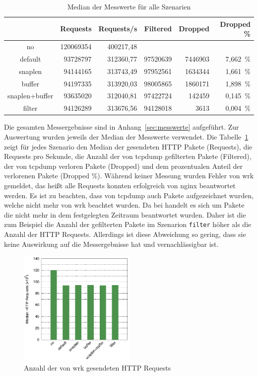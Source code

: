 \begin{table}
  \centering
  \bgroup
  \def\arraystretch{1.2}
  \begin{tabular}{crrrrr}
      & \textbf{Requests} & \textbf{Requests/s} & \textbf{Filtered} & \textbf{Dropped} & \textbf{Dropped \%} \\\hline\hline
no & 120069354 & 400217,48 &  &  & \\\hline
default & 93728797 & 312360,77 & 97520639 & 7446903 & 7,662~\%\\\hline
snaplen & 94144165 & 313743,49 & 97952561 & 1634344 & 1,661~\%\\\hline
buffer & 94197335 & 313920,03 & 98005865 & 1860171 & 1,898~\%\\\hline
snaplen+buffer & 93635020 & 312040,81 & 97422724 & 142459 & 0,145~\%\\\hline
filter & 94126289 & 313676,56 & 94128018 & 3613 & 0,004~\%\\\hline
  \end{tabular}
  \egroup
  \caption{Median der Messwerte für alle Szenarien}\label{tab:messwerte}
\end{table}

Die gesamten Messergebnisse sind in Anhang~\ref{sec:messwerte} aufgeführt. Zur
Auswertung wurden jeweils der Median der Messwerte verwendet. Die
Tabelle~\ref{tab:messwerte} zeigt für jedes Szenario den Median der gesendeten
HTTP Pakete (Requests), die Requests pro Sekunde, die Anzahl der von tcpdump gefilterten
Pakete (Filtered), der von tcpdump verloren Pakete (Dropped) und dem
prozentualen Anteil der verlorenen Pakete (Dropped \%). Während keiner Messung
wurden Fehler von wrk gemeldet, das heißt alle Requests konnten erfolgreich von
nginx beantwortet werden. Es ist zu beachten, dass von tcpdump auch Pakete
aufgezeichnet wurden, welche nicht mehr von wrk beachtet wurden. Da bei handelt
es sich um Pakete die nicht mehr in dem festgelegten Zeitraum beantwortet wurden.
Daher ist die zum Beispiel die Anzahl der gefilterten Pakete im Szenarion \texttt{filter}
höher als die Anzahl der HTTP Requests. Allerdings ist diese Abweichung so gering,
dass sie keine Auswirkung auf die Messergebnisse hat und vernachlässigbar ist.

\begin{figure}
    \centering
    \includegraphics[width=0.5\textwidth]{images/requests}
    \caption{Anzahl der von wrk gesendeten HTTP Requests}\label{fig:results}
\end{figure}

